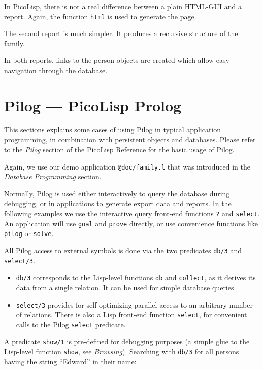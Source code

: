 In PicoLisp, there is not a real difference between a plain HTML-GUI and
a report. Again, the function \texttt{html} is used to generate the page.

The second report is much simpler. It produces a recursive structure of
the family.

In both reports, links to the person objects are created which allow
easy navigation through the database.

 
\section{Pilog --- PicoLisp Prolog}
\label{sec:tut-pilog-picolisp-prolog}


This sections explains some cases of using Pilog in typical application
programming, in combination with persistent objects and databases.
Please refer to the \emph{Pilog} section of the PicoLisp
Reference for the basic usage of Pilog.

Again, we use our demo application \texttt{@doc/family.l} that was introduced
in the \emph{Database Programming} section.

Normally, Pilog is used either interactively to query the database
during debugging, or in applications to generate export data and
reports. In the following examples we use the interactive query
front-end functions \texttt{?} and \texttt{select}. An application will use \texttt{goal} and
\texttt{prove} directly, or use convenience functions like \texttt{pilog} or \texttt{solve}.

All Pilog access to external symbols is done via the two predicates
\texttt{db/3} and \texttt{select/3}.

\begin{itemize}
\item \texttt{db/3} corresponds to the Lisp-level functions \texttt{db} and \texttt{collect}, as
   it derives its data from a single relation. It can be used for simple
   database queries.
\item \texttt{select/3} provides for self-optimizing parallel access to an
   arbitrary number of relations. There is also a Lisp front-end
   function \texttt{select}, for convenient calls to the Pilog \texttt{select}
   predicate.
\end{itemize}

A predicate \texttt{show/1} is pre-defined for debugging purposes (a simple
glue to the Lisp-level function \texttt{show}, see \emph{Browsing}).
Searching with \texttt{db/3} for all persons having the string ``Edward'' in
their name:


